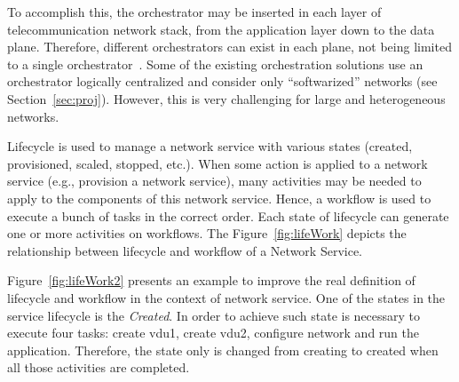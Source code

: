 To accomplish this, the orchestrator may be inserted in each layer of telecommunication network stack, from the application layer down to the data plane. Therefore, different orchestrators can exist in each plane, not being limited to a single orchestrator~\cite{Alvizu2016AdvanceEra}. Some of the existing orchestration solutions use an orchestrator logically centralized and consider only ``softwarized'' networks (see Section~\ref{sec:proj}). However, this is very challenging for large and heterogeneous networks. 

Lifecycle is used to manage a network service with various states (created, provisioned, scaled, stopped, etc.). When some action is applied to a network service (e.g., provision a network service), many activities may be needed to apply to the components of this network service. Hence, a workflow is used to execute a bunch of tasks in the correct order. Each state of lifecycle can generate one or more activities on workflows. The Figure~\ref{fig:lifeWork} depicts the relationship between lifecycle and workflow of a Network Service. 

Figure~\ref{fig:lifeWork2} presents an example to improve the real definition of lifecycle and workflow in the context of network service. One of the states in the service lifecycle is the \textit{Created}. In order to achieve such state is necessary to execute four tasks: create \gls{vdu}1, create \gls{vdu}2, configure network and run the application. Therefore, the state only is changed from creating to created when all those activities are completed.

